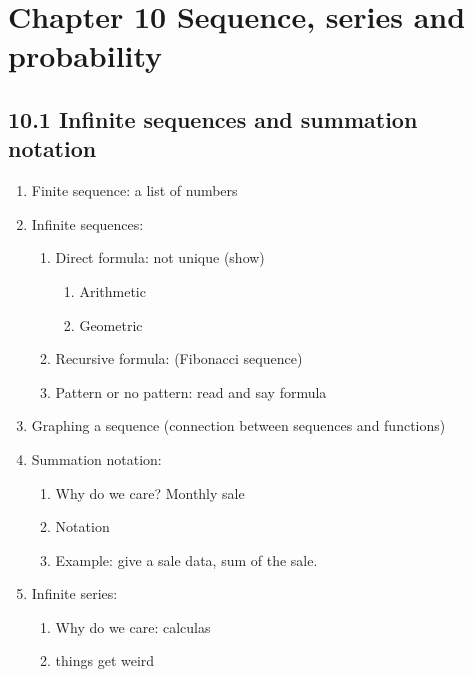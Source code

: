 \documentclass{article}
\begin{document}
\section{Chapter 10 Sequence, series and probability}
\subsection*{10.1 Infinite sequences and summation notation}
\begin{enumerate}
\item Finite sequence: a list of numbers
\item Infinite sequences:
\begin{enumerate}
\item Direct formula: not unique (show)
\begin{enumerate}
\item Arithmetic
\item Geometric
\end{enumerate}
\item Recursive formula: (Fibonacci sequence)
\item Pattern or no pattern: read and say formula
\end{enumerate}
\item Graphing a sequence (connection between sequences and functions)
\item Summation notation: 
\begin{enumerate}
\item Why do we care? Monthly sale
\item Notation
\item Example: give a sale data, sum of the sale.
\end{enumerate}
\item Infinite series: 
\begin{enumerate}
\item Why do we care: calculas
\item things get weird
\end{enumerate}
\end{enumerate}
\end{document}
